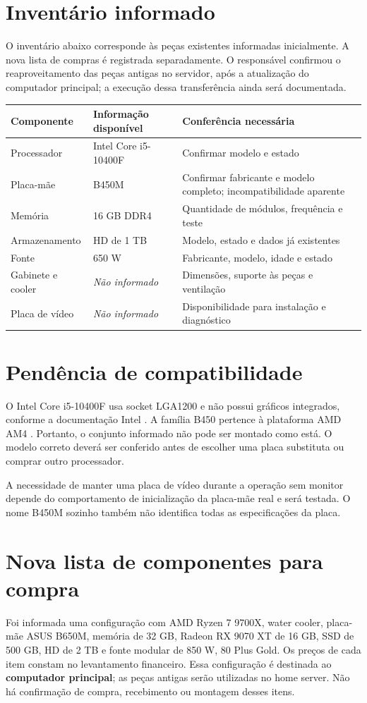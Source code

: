 \documentclass[11pt,a4paper,oneside]{report}
\newcommand{\naoinformado}{\textit{Não informado}}
\begin{document}
\section{Inventário informado}
O inventário abaixo corresponde às peças existentes informadas inicialmente.
A nova lista de compras é registrada separadamente. O responsável confirmou
o reaproveitamento das peças antigas no servidor, após a atualização do computador
principal; a execução dessa transferência ainda será documentada.
\begin{tabularx}{\textwidth}{@{}p{3cm}p{3.7cm}Y@{}}
\toprule
Componente & Informação disponível & Conferência necessária \\
\midrule
Processador & Intel Core i5-10400F & Confirmar modelo e estado \\
Placa-mãe & B450M & Confirmar fabricante e modelo completo; incompatibilidade aparente \\
Memória & 16 GB DDR4 & Quantidade de módulos, frequência e teste \\
Armazenamento & HD de 1 TB & Modelo, estado e dados já existentes \\
Fonte & 650 W & Fabricante, modelo, idade e estado \\
Gabinete e cooler & \naoinformado & Dimensões, suporte às peças e ventilação \\
Placa de vídeo & \naoinformado & Disponibilidade para instalação e diagnóstico \\
\bottomrule
\end{tabularx}

\section{Pendência de compatibilidade}
O Intel Core i5-10400F usa socket LGA1200 e não possui gráficos integrados,
conforme a documentação Intel \cite{intelcpu,intelf}. A família B450 pertence
à plataforma AMD AM4 \cite{amdb450}. Portanto, o conjunto informado não pode
ser montado como está. O modelo correto deverá ser conferido antes de escolher
uma placa substituta ou comprar outro processador.

A necessidade de manter uma placa de vídeo durante a operação sem monitor
depende do comportamento de inicialização da placa-mãe real e será testada.
O nome B450M sozinho também não identifica todas as especificações da placa.

\section{Nova lista de componentes para compra}
Foi informada uma configuração com AMD Ryzen 7 9700X, water cooler, placa-mãe
ASUS B650M, memória de 32 GB, Radeon RX 9070 XT de 16 GB, SSD de 500 GB,
HD de 2 TB e fonte modular de 850 W, 80 Plus Gold. Os preços de cada item
constam no levantamento financeiro. Essa configuração é destinada ao
\textbf{computador principal}; as peças antigas serão utilizadas no home server.
Não há confirmação de compra, recebimento ou montagem desses itens.
\end{document}
